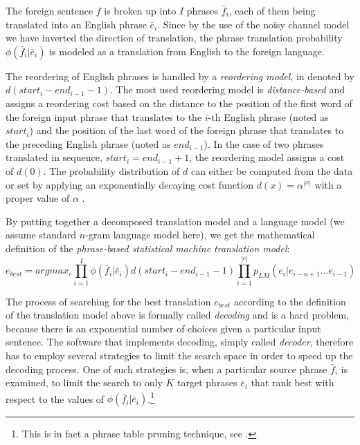 The foreign sentence $f$ is broken up into $I$ phrases $\bar{f}_i$, each of them
being translated into an English phrase $\bar{e}_i$. Since by the use of the noisy channel
model we have inverted the direction of translation, the phrase translation probability
$\phi(\bar{f}_i|\bar{e}_i)$ is modeled as a translation from English to the foreign language.

The reordering of English phrases is handled by a \emph{reordering model}, in 
denoted by $d(start_i - end_{i-1} - 1)$.
The most used reordering model is \emph{distance-based} and assigns a reordering cost based
on the distance to the position of the first word of the foreign input phrase that translates to
the $i$-th English phrase (noted as $start_i$) and the position of the last word of the foreign
phrase that translates to the preceding English phrase (noted as $end_{i-1}$).
In the case of two phrases translated in sequence, $start_i = end_{i-1} +1$, the
reordering model assigns a cost of $d(0)$.
The probability distribution of $d$ can either be computed from the data or set by applying
an exponentially decaying cost function $d(x) = \alpha^{|x|}$ with a proper value of $\alpha$
\citep{koehn:smt}.

By putting together a decomposed translation model and a language model (we assume standard $n$-gram
language model here), we get the mathematical definition of the
\emph{phrase-based statistical machine translation model}:
\begin{equation} \label{eq:pbsmt}
  e_{best} = argmax_e \prod_{i=1}^I \phi(\bar{f}_i|\bar{e}_i) d(start_i - end_{i-1} - 1) \prod_{i=1}^{|e|} p_{LM}(e_i|e_{i-n+1}...e_{i-1})
\end{equation}

The process of searching for the best translation $e_{best}$ according to the definition of
the translation model above is formally called \emph{decoding} and is a hard problem,
because there is an exponential number of choices given a particular input sentence.
The software that implements decoding, simply called \emph{decoder}, therefore has to employ
several strategies to limit the search space in order to speed up the decoding process.
One of such strategies is, when a particular source phrase $\bar{f}_i$ is examined,
to limit the search to only $K$ target phrases $\bar{e}_i$ that rank best
with respect to the values of $\phi(\bar{f}_i|\bar{e}_i)$.\footnote{This is in fact
a phrase table pruning technique, see .}

\newpage

